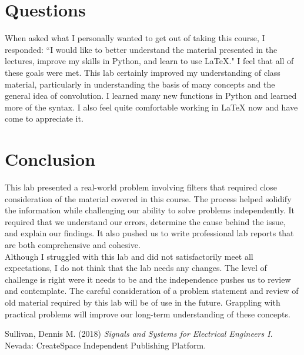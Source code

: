 \documentclass[12pt]{report}
\begin{document}
\section{Questions}

When asked what I personally wanted to get out of taking this course, I responded: ``I would like to better understand the material presented in the lectures,
improve my skills in Python, and learn to use LaTeX." I feel that all of these goals were met. This lab certainly improved my understanding of class material, particularly in understanding the basis of many concepts and the general idea of convolution. I learned many new functions in Python and learned more of the syntax. I also feel quite comfortable working in LaTeX now and have come to appreciate it. \\

\section{Conclusion}

This lab presented a real-world problem involving filters that required close consideration of the material covered in this course. The process helped solidify the information while challenging our ability to solve problems independently. It required that we understand our errors, determine the cause behind the issue, and explain our findings. It also pushed us to write professional lab reports that are both comprehensive and cohesive. \\

Although I struggled with this lab and did not satisfactorily meet all expectations, I do not think that the lab needs any changes. The level of challenge is right were it needs to be and the independence pushes us to review and contemplate. The careful consideration of a problem statement and review of old material required by this lab will be of use in the future. Grappling with practical problems will improve our long-term understanding of these concepts. \\

\newpage
\begin{thebibliography}{111}
	
	Sullivan, Dennis M. (2018) {\it  Signals and Systems for Electrical Engineers I}. Nevada: CreateSpace Independent Publishing Platform.
	
\end{thebibliography}
\end{document}
